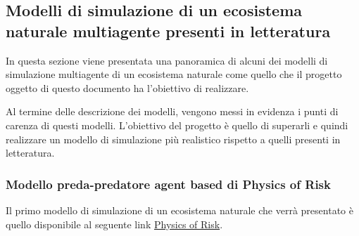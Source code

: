\documentclass[11pt]{article}
\begin{document}
\subsection{Modelli di simulazione di un ecosistema naturale multiagente presenti in letteratura}
In questa sezione viene presentata una panoramica di alcuni dei modelli di simulazione multiagente di un ecosistema naturale come quello che il progetto oggetto di questo documento ha l'obiettivo di realizzare. 

Al termine delle descrizione dei modelli, vengono messi in evidenza i punti di carenza di questi modelli. L'obiettivo del progetto è quello di superarli e quindi realizzare un modello di simulazione più realistico rispetto a quelli presenti in letteratura.

\subsubsection{Modello preda-predatore agent based di Physics of Risk}
Il primo modello di simulazione di un ecosistema naturale che verrà presentato è quello disponibile al seguente link \href{https://rf.mokslasplius.lt/agent-based-prey-predator-model/}{Physics of Risk}.
\end{document}

